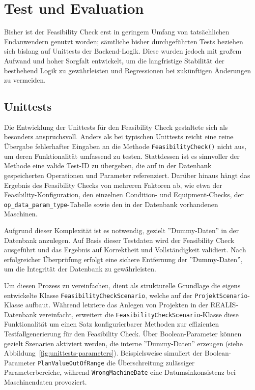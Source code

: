 \chapter{Test und Evaluation}

Bisher ist der Feasibility Check erst in geringem Umfang von tatsächlichen Endanwendern genutzt worden; sämtliche bisher durchgeführten Tests beziehen sich bislang auf Unittests der Backend-Logik. Diese wurden jedoch mit großem Aufwand und hoher Sorgfalt entwickelt, um die langfristige Stabilität der besthehend Logik zu gewährleisten und Regressionen bei zukünftigen Änderungen zu vermeiden.

\section{Unittests}

Die Entwicklung der Unittests für den Feasibility Check gestaltete sich als besonders anspruchsvoll. Anders als bei typischen Unittests reicht eine reine Übergabe fehlerhafter Eingaben an die Methode \texttt{FeasibilityCheck()} nicht aus, um deren Funktionalität umfassend zu testen. Stattdessen ist es sinnvoller der Methode eine valide Test-ID zu übergeben, die auf in der Datenbank gespeicherten Operationen und Parameter referenziert. Darüber hinaus hängt das Ergebnis des Feasibility Checks von mehreren Faktoren ab, wie etwa der Feasibility-Konfiguration, den einzelnen Condition- und Equipment-Checks, der \texttt{op\_data\_param\_type}-Tabelle sowie den in der Datenbank vorhandenen Maschinen.

Aufgrund dieser Komplexität ist es notwendig, gezielt ''Dummy-Daten'' in der Datenbank anzulegen. Auf Basis dieser Testdaten wird der Feasibility Check ausgeführt und das Ergebnis auf Korrektheit und Vollständigkeit validiert. Nach erfolgreicher Überprüfung erfolgt eine sichere Entfernung der ''Dummy-Daten'', um die Integrität der Datenbank zu gewährleisten.

Um diesen Prozess zu vereinfachen, dient als strukturelle Grundlage die eigens entwickelte Klasse \texttt{FeasibilityCheckScenario}, welche auf der \texttt{ProjektScenario}-Klasse aufbaut. Während letztere das Anlegen von Projekten in der REALIS-Datenbank vereinfacht, erweitert die \texttt{FeasibilityCheckScenario}-Klasse diese Funktionalität um einen Satz konfigurierbarer Methoden zur effizienten Testfallgenerierung für den Feasibility Check. Über Boolean-Parameter können gezielt Szenarien aktiviert werden, die interne ''Dummy-Daten'' erzeugen (siehe Abbildung~\ref{fig:unittests-parameters}). Beispielsweise simuliert der Boolean-Parameter \texttt{PlanValueOutOfRange} die Überschreitung zulässiger Parameterbereiche, während \texttt{WrongMachineDate} eine Datumsinkonsistenz bei Maschinendaten provoziert.

